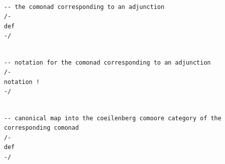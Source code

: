 \documentclass{book}
\newcounter{lcounter}
\begin{document}
\begin{center}
\begin{tcolorbox}[width=5in,colback={white},title={\begin{center}\texttt{Lean \thelcounter} \addtocounter{lcounter}{1}  \end{center}},colbacktitle=Blue,coltitle=black]
\begin{verbatim}

-- the comonad corresponding to an adjunction
/-
def
-/

\end{verbatim}%
\end{tcolorbox}
\end{center}



\begin{center}
\begin{tcolorbox}[width=5in,colback={white},title={\begin{center}\texttt{Lean \thelcounter} \addtocounter{lcounter}{1}  \end{center}},colbacktitle=Blue,coltitle=black]
\begin{verbatim}

-- notation for the comonad corresponding to an adjunction
/-
notation !
-/

\end{verbatim}%
\end{tcolorbox}
\end{center}



\begin{center}
\begin{tcolorbox}[width=5in,colback={white},title={\begin{center}\texttt{Lean \thelcounter} \addtocounter{lcounter}{1}  \end{center}},colbacktitle=Blue,coltitle=black]
\begin{verbatim}

-- canonical map into the coeilenberg comoore category of the corresponding comonad
/-
def
-/

\end{verbatim}%
\end{tcolorbox}
\end{center}
\end{document}
